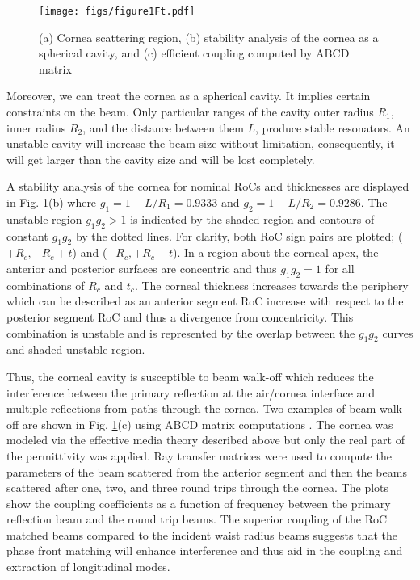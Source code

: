 \documentclass{osa-article}
\begin{document}
\begin{figure}[htbp]
\centering
\texttt{[image: figs/figure1Ft.pdf]}
\caption{(a) Cornea scattering region, (b) stability analysis of the cornea as a spherical cavity, and (c) efficient coupling computed by ABCD matrix}\label{Cavity}
\end{figure}

Moreover, we can treat the cornea as a spherical cavity. It implies certain constraints on the beam. Only particular ranges of the cavity outer radius $R_1$, inner radius $R_2$, and the distance between them $L$, produce stable resonators. An unstable cavity will increase the beam size without limitation, consequently, it will get larger than the cavity size and will be lost completely.

A stability analysis of the cornea for nominal RoCs and thicknesses are displayed in Fig. \ref{Cavity}(b) where $g_1 = 1-L/R_1=0.9333$ and $g_2 = 1-L/R_2=0.9286$. The unstable region $g_1g_2>1$ is indicated by the shaded region and contours of constant $g_1g_2$ by the dotted lines. For clarity, both RoC sign pairs are plotted; ($+R_c, -R_c+t$) and ($-R_c, +R_c-t$). In a region about the corneal apex, the anterior and posterior surfaces are concentric and thus $g_1g_2 = 1$ for all combinations of $R_c$ and $t_c$. The corneal thickness increases towards the periphery which can be described as an anterior segment RoC increase with respect to the posterior segment RoC and thus a divergence from concentricity. This combination is unstable and is represented by the overlap between the $g_1g_2$ curves and shaded unstable region.

Thus, the corneal cavity is susceptible to beam walk-off which reduces the interference between the primary reflection at the air/cornea interface and multiple reflections from paths through the cornea. Two examples of beam walk-off are shown in Fig. \ref{Cavity}(c) using ABCD matrix computations \cite{abcd}. The cornea was modeled via the effective media theory described above but only the real part of the permittivity was applied. Ray transfer matrices were used to compute the parameters of the beam scattered from the anterior segment and then the beams scattered after one, two, and three round trips through the cornea. The plots show the coupling coefficients as a function of frequency between the primary reflection beam and the round trip beams. The superior coupling of the RoC matched beams compared to the incident waist radius beams suggests that the phase front matching will enhance interference and thus aid in the coupling and extraction of longitudinal modes.
\end{document}
